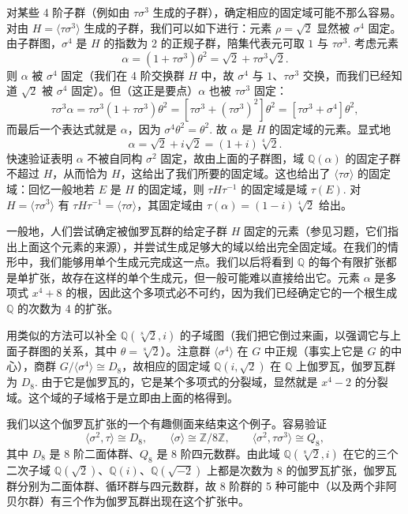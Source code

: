 对某些 4 阶子群（例如由 \(\tau\sigma^3\) 生成的子群），确定相应的固定域可能不那么容易。对由 \(H = \langle \tau\sigma^3 \rangle\) 生成的子群，我们可以如下进行：元素 \(\rho = \sqrt{2}\) 显然被 \(\sigma^4\) 固定。由子群图，\(\sigma^4\) 是 \(H\) 的指数为 2 的正规子群，陪集代表元可取 \(1\) 与 \(\tau\sigma^3\). 考虑元素
\[
\alpha = (1+\tau\sigma^3)\theta^2 = \sqrt{2}+\tau\sigma^3\sqrt{2}.
\]
则 \(\alpha\) 被 \(\sigma^4\) 固定（我们在 4 阶交换群 \(H\) 中，故 \(\sigma^4\) 与 \(1\)、\(\tau\sigma^3\) 交换，而我们已经知道 \(\sqrt{2}\) 被 \(\sigma^4\) 固定）。但（这正是要点）\(\alpha\) 也被 \(\tau\sigma^3\) 固定：
\[
\tau\sigma^3\alpha = \tau\sigma^3(1+\tau\sigma^3)\theta^2 = [\tau\sigma^3+(\tau\sigma^3)^2]\theta^2 = [\tau\sigma^3+\sigma^4]\theta^2,
\]
而最后一个表达式就是 \(\alpha\)，因为 \(\sigma^4\theta^2 = \theta^2\). 故 \(\alpha\) 是 \(H\) 的固定域的元素。显式地
\[
\alpha = \sqrt{2}+i\sqrt{2} = (1+i)\sqrt[4]{2}.
\]
快速验证表明 \(\alpha\) 不被自同构 \(\sigma^2\) 固定，故由上面的子群图，域 \(\mathbb{Q}(\alpha)\) 的固定子群不超过 \(H\)，从而恰为 \(H\)，这给出了我们所要的固定域。这也给出了 \(\langle \tau\sigma \rangle\) 的固定域：回忆一般地若 \(E\) 是 \(H\) 的固定域，则 \(\tau H\tau^{-1}\) 的固定域是域 \(\tau(E)\). 对 \(H = \langle \tau\sigma^3 \rangle\) 有 \(\tau H\tau^{-1} = \langle \tau\sigma \rangle\)，其固定域由 \(\tau(\alpha) = (1-i)\sqrt[4]{2}\) 给出。

一般地，人们尝试确定被伽罗瓦群的给定子群 \(H\) 固定的元素（参见习题，它们指出上面这个元素的来源），并尝试生成足够大的域以给出完全固定域。在我们的情形中，我们能够用单个生成元完成这一点。我们以后将看到 \(\mathbb{Q}\) 的每个有限扩张都是单扩张，故存在这样的单个生成元，但一般可能难以直接给出它。元素 \(\alpha\) 是多项式 \(x^4+8\) 的根，因此这个多项式必不可约，因为我们已经确定它的一个根生成 \(\mathbb{Q}\) 的次数为 4 的扩张。

用类似的方法可以补全 \(\mathbb{Q}(\sqrt[8]{2}, i)\) 的子域图（我们把它倒过来画，以强调它与上面子群图的关系，其中 \(\theta = \sqrt[8]{2}\)）。注意群 \(\langle \sigma^4 \rangle\) 在 \(G\) 中正规（事实上它是 \(G\) 的中心），商群 \(G/\langle \sigma^4 \rangle \cong D_8\)，故相应的固定域 \(\mathbb{Q}(i, \sqrt{2})\) 在 \(\mathbb{Q}\) 上伽罗瓦，伽罗瓦群为 \(D_8\). 由于它是伽罗瓦的，它是某个多项式的分裂域，显然就是 \(x^4-2\) 的分裂域。这个域的子域格于是立即由上面的格得到。

我们以这个伽罗瓦扩张的一个有趣侧面来结束这个例子。容易验证
\[
\langle \sigma^2, \tau \rangle \cong D_8, \qquad \langle \sigma \rangle \cong \mathbb{Z}/8\mathbb{Z}, \qquad \langle \sigma^2, \tau\sigma^3 \rangle \cong Q_8,
\]
其中 \(D_8\) 是 8 阶二面体群、\(Q_8\) 是 8 阶四元数群。由此域 \(\mathbb{Q}(\sqrt[8]{2}, i)\) 在它的三个二次子域 \(\mathbb{Q}(\sqrt{2})\)、\(\mathbb{Q}(i)\)、\(\mathbb{Q}(\sqrt{-2})\) 上都是次数为 8 的伽罗瓦扩张，伽罗瓦群分别为二面体群、循环群与四元数群，故 8 阶群的 5 种可能中（以及两个非阿贝尔群）有三个作为伽罗瓦群出现在这个扩张中。

